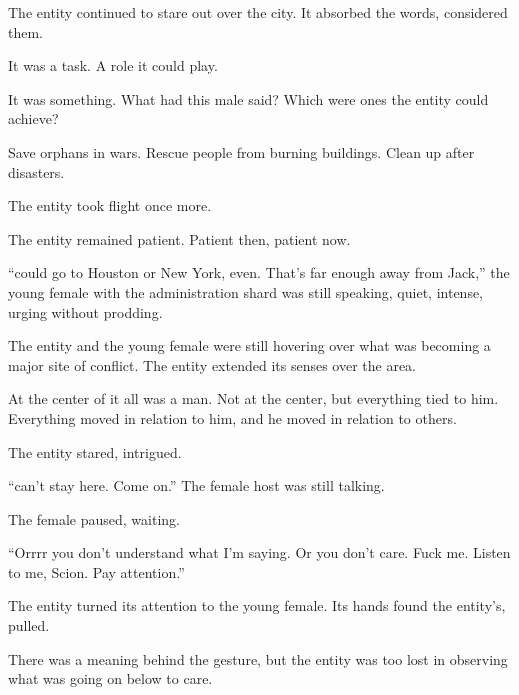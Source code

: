 The entity continued to stare out over the city.  It absorbed the words, considered them.



It was a task.  A role it could play.



It was something.  What had this male said?  Which were ones the entity could achieve?



Save orphans in wars.  Rescue people from burning buildings.  Clean up after disasters.



The entity took flight once more.



\blacksquare



The entity remained patient.  Patient then, patient now.



``\ldotsYou could go to Houston or New York, even.  That's far enough away from Jack,'' the young female with the administration shard was still speaking, quiet, intense, urging without prodding.



The entity and the young female were still hovering over what was becoming a major site of conflict.  The entity extended its senses over the area.



At the center of it all was a man.  Not at the center, but everything tied to him.  Everything moved in relation to him, and he moved in relation to others.



The entity stared, intrigued.



``\ldotsWe can't stay here.  Come on.''  The female host was still talking.



The female paused, waiting.



``Orrrr you don't understand what I'm saying.  Or you don't care.  Fuck me.  Listen to me, Scion.  Pay attention.''



The entity turned its attention to the young female.  Its hands found the entity's, pulled.



There was a meaning behind the gesture, but the entity was too lost in observing what was going on below to care.



